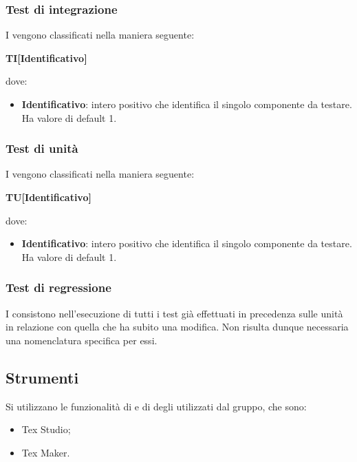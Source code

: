 		\subsubsection{Test di integrazione}
		I  vengono classificati nella maniera seguente:
		\begin{center}
			\textbf{TI[Identificativo]}
		\end{center}	
		dove:\\
		\begin{itemize}
			\item \textbf{Identificativo}: intero positivo che identifica il singolo componente da testare. Ha valore di default 1.
		\end{itemize}		 
		
		\subsubsection{Test di unità}
		I  vengono classificati nella maniera seguente:
		\begin{center}
			\textbf{TU[Identificativo]}
		\end{center}		
		dove:\\
		\begin{itemize}
			\item \textbf{Identificativo}: intero positivo che identifica il singolo componente da testare. Ha valore di default 1.
		\end{itemize}
		
		\subsubsection{Test di regressione}
		I  consistono nell'esecuzione di tutti i test già effettuati in precedenza sulle unità in relazione con quella che ha subito una modifica. Non risulta dunque necessaria una nomenclatura specifica per essi.
		
		\subsection{Strumenti}
		Si utilizzano le funzionalità di  e di  degli  utilizzati dal gruppo, che sono:
		\begin{itemize}
			\item Tex Studio;
			\item Tex Maker.
		\end{itemize}
